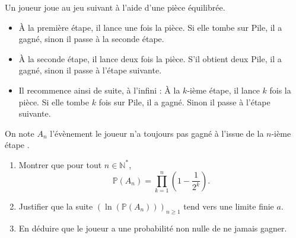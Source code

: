 \documentclass[../PolyS4.tex]{subfiles}
\begin{document}
Un joueur joue au jeu suivant à l'aide d'une pièce équilibrée.
\begin{itemize}
    \item À la première étape, il lance une fois la pièce. Si elle tombe sur Pile, il a gagné, sinon il passe à la seconde étape.
    \item À la seconde étape, il lance deux fois la pièce. S'il obtient deux Pile, il a gagné, sinon il passe à l'étape suivante.
    \item Il recommence ainsi de suite, à l'infini : À la $k$-ième étape, il lance $k$ fois la pièce. Si elle tombe $k$ fois sur Pile, il a gagné. Sinon il passe à l'étape suivante.
\end{itemize}

On note $A_n$ l'évènement \og  le joueur n'a toujours pas gagné à l'issue de la $n$-ième étape \fg{} .
\begin{enumerate}
    \item Montrer que pour tout $n \in \mathbb{N}^*$, 
    \[
    \mathbb{P}(A_n) = \prod_{k=1}^{n} \left(1 - \frac{1}{2^k}\right).
    \]
    \item Justifier que la suite $(\ln(\mathbb{P}(A_n)))_{n \geq 1}$ tend vers une limite finie $a$.
    \item En déduire que le joueur a une probabilité non nulle de ne jamais gagner.\\
\end{enumerate}


\end{document}
